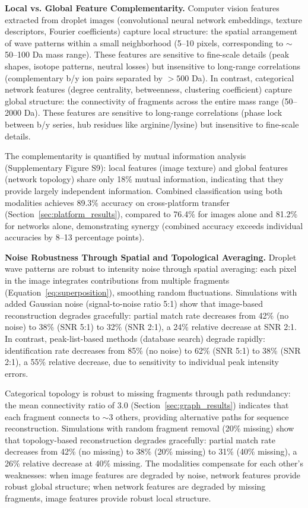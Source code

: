 \documentclass[11pt,twocolumn]{article}
\begin{document}
\textbf{Local vs. Global Feature Complementarity.} Computer vision features extracted from droplet images (convolutional neural network embeddings, texture descriptors, Fourier coefficients) capture local structure: the spatial arrangement of wave patterns within a small neighborhood (5--10 pixels, corresponding to $\sim$50--100 Da mass range). These features are sensitive to fine-scale details (peak shapes, isotope patterns, neutral losses) but insensitive to long-range correlations (complementary b/y ion pairs separated by $> 500$ Da). In contrast, categorical network features (degree centrality, betweenness, clustering coefficient) capture global structure: the connectivity of fragments across the entire mass range (50--2000 Da). These features are sensitive to long-range correlations (phase lock between b/y series, hub residues like arginine/lysine) but insensitive to fine-scale details.

The complementarity is quantified by mutual information analysis (Supplementary Figure S9): local features (image texture) and global features (network topology) share only 18\% mutual information, indicating that they provide largely independent information. Combined classification using both modalities achieves 89.3\% accuracy on cross-platform transfer (Section~\ref{sec:platform_results}), compared to 76.4\% for images alone and 81.2\% for networks alone, demonstrating synergy (combined accuracy exceeds individual accuracies by 8--13 percentage points).

\textbf{Noise Robustness Through Spatial and Topological Averaging.} Droplet wave patterns are robust to intensity noise through spatial averaging: each pixel in the image integrates contributions from multiple fragments (Equation~\ref{eq:superposition}), smoothing random fluctuations. Simulations with added Gaussian noise (signal-to-noise ratio 5:1) show that image-based reconstruction degrades gracefully: partial match rate decreases from 42\% (no noise) to 38\% (SNR 5:1) to 32\% (SNR 2:1), a 24\% relative decrease at SNR 2:1. In contrast, peak-list-based methods (database search) degrade rapidly: identification rate decreases from 85\% (no noise) to 62\% (SNR 5:1) to 38\% (SNR 2:1), a 55\% relative decrease, due to sensitivity to individual peak intensity errors.

Categorical topology is robust to missing fragments through path redundancy: the mean connectivity ratio of 3.0 (Section~\ref{sec:graph_results}) indicates that each fragment connects to $\sim$3 others, providing alternative paths for sequence reconstruction. Simulations with random fragment removal (20\% missing) show that topology-based reconstruction degrades gracefully: partial match rate decreases from 42\% (no missing) to 38\% (20\% missing) to 31\% (40\% missing), a 26\% relative decrease at 40\% missing. The modalities compensate for each other's weaknesses: when image features are degraded by noise, network features provide robust global structure; when network features are degraded by missing fragments, image features provide robust local structure.
\end{document}
